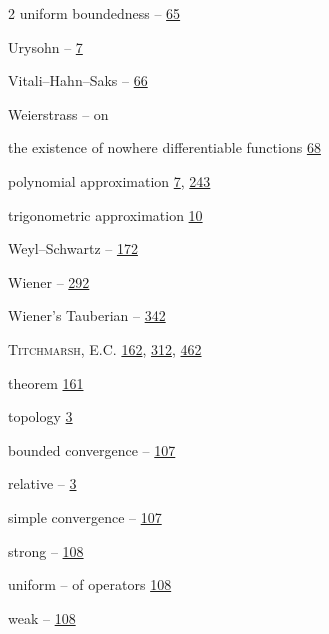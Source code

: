 \begin{multicols}{2}
\hspace*{1.1em}uniform boundedness -- \hyperlink{page.65}{65}\par
\hspace*{1.1em}Urysohn -- \hyperlink{page.7}{7}\par
\hspace*{1.1em}Vitali--Hahn--Saks -- \hyperlink{page.66}{66}\par
\hspace*{1.1em}Weierstrass -- on\par
\hspace*{2.2em}the existence of nowhere differentiable functions \hyperlink{page.68}{68}\par
\hspace*{2.2em}polynomial approximation \hyperlink{page.7}{7}, \hyperlink{page.243}{243}\par
\hspace*{2.2em}trigonometric approximation \hyperlink{page.10}{10}\par
\hspace*{1.1em}Weyl--Schwartz -- \hyperlink{page.172}{172}\par
\hspace*{1.1em}Wiener -- \hyperlink{page.292}{292}\par
\hspace*{1.1em}Wiener's Tauberian -- \hyperlink{page.342}{342}\par
\noindent \textsc{Titchmarsh}, E.C. \hyperlink{page.162}{162}, \hyperlink{page.312}{312}, \hyperlink{page.462}{462}\par
\hspace*{1.1em}theorem \hyperlink{page.161}{161}\par
\noindent topology \hyperlink{page.3}{3}\par
\hspace*{1.1em}bounded convergence -- \hyperlink{page.107}{107}\par
\hspace*{1.1em}relative -- \hyperlink{page.3}{3}\par
\hspace*{1.1em}simple convergence -- \hyperlink{page.107}{107}\par
\hspace*{1.1em}strong -- \hyperlink{page.108}{108}\par
\hspace*{1.1em}uniform -- of operators \hyperlink{page.108}{108}\par
\hspace*{1.1em}weak -- \hyperlink{page.108}{108}\par

\end{multicols}
